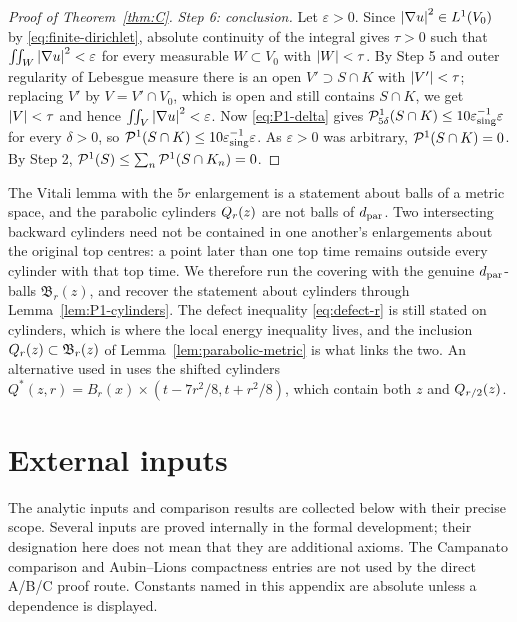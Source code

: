 \documentclass[11pt,reqno]{amsart}
\begin{document}
\begin{proof}[Proof of Theorem~\ref{thm:C}]
\emph{Step 6: conclusion.} Let $\varepsilon>0$. Since
$\left\lvert \nabla u \right\rvert^{2}\in L^{1}(V_{0})$ by \eqref{eq:finite-dirichlet}, absolute
continuity of the integral gives $\tau>0$ such that
$\iint_{W}\left\lvert \nabla u \right\rvert^{2}<\varepsilon$ for every measurable $W\subset V_{0}$
with $\left\lvert W \right\rvert<\tau$. By Step 5 and outer regularity of Lebesgue measure there is
an open $V'\supset S\cap K$ with $\left\lvert V' \right\rvert<\tau$; replacing $V'$ by
$V=V'\cap V_{0}$, which is open and still contains $S\cap K$, we get
$\left\lvert V \right\rvert<\tau$ and hence $\iint_{V}\left\lvert \nabla u \right\rvert^{2}<\varepsilon$. Now
\eqref{eq:P1-delta} gives $\mathcal{P}^{1}_{5\delta}(S\cap K)\le10\varepsilon_{\mathrm{sing}}^{-1}\varepsilon$
for every $\delta>0$, so $\mathcal{P}^{1}(S\cap K)\le10\varepsilon_{\mathrm{sing}}^{-1}\varepsilon$.
As $\varepsilon>0$ was arbitrary, $\mathcal{P}^{1}(S\cap K)=0$. By Step 2,
$\mathcal{P}^{1}(S)\le\sum_{n}\mathcal{P}^{1}(S\cap K_{n})=0$.
\end{proof}

\begin{remark}
\label{rem:balls-vs-cylinders}
The Vitali lemma with the $5r$ enlargement is a statement about balls of a
metric space, and the parabolic cylinders $Q_{r}(z)$ are not balls of
$d_{\mathrm{par}}$. Two intersecting backward cylinders need not be contained in
one another's enlargements about the original top centres: a point later
than one top time remains outside every cylinder with that top time.
We therefore run the covering with the genuine $d_{\mathrm{par}}$-balls
$\mathfrak{B}_{r}(z)$, and recover the statement about cylinders through
Lemma~\ref{lem:P1-cylinders}. The defect inequality \eqref{eq:defect-r} is still
stated on cylinders, which is where the local energy inequality lives, and the
inclusion $Q_{r}(z)\subset\mathfrak{B}_{r}(z)$ of
Lemma~\ref{lem:parabolic-metric} is what links the two. An alternative used in
\cite[\S6.2, pp.~96--97]{Tsai2018} uses the shifted cylinders
$Q^*(z,r)=B_r(x)\times(t-7r^2/8,t+r^2/8)$, which contain both $z$ and
$Q_{r/2}(z)$.
\end{remark}

\appendix

\section{External inputs}\label{sec:external}

The analytic inputs and comparison results are collected below with their
precise scope. Several inputs are proved internally in the formal development;
their designation here does not mean that they are additional axioms.
The Campanato comparison and Aubin--Lions compactness entries are not used
by the direct A/B/C proof route. Constants named in this
appendix are absolute unless a dependence is displayed.
\end{document}
